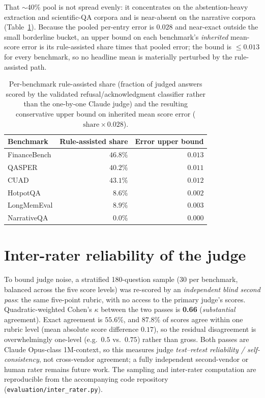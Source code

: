 That $\sim$40\% pool is not spread evenly: it concentrates on the
abstention-heavy extraction and scientific-QA corpora and is near-absent on the
narrative corpora (Table~\ref{tab:refusalshare}). Because the pooled per-entry
error is $0.028$ and near-exact outside the small borderline bucket, an upper
bound on each benchmark's \emph{inherited} mean-score error is its rule-assisted
share times that pooled error; the bound is $\le 0.013$ for every benchmark, so
no headline mean is materially perturbed by the rule-assisted path.

\begin{table}[h]
  \centering
  \caption{Per-benchmark rule-assisted share (fraction of judged answers scored
  by the validated refusal/acknowledgment classifier rather than the one-by-one
  Claude judge) and the resulting conservative upper bound on inherited mean
  score error ($\text{share}\times0.028$).}
  \label{tab:refusalshare}
  \begin{tabular}{lrr}
    \toprule
    Benchmark & Rule-assisted share & Error upper bound \\
    \midrule
    FinanceBench & $46.8\%$ & $0.013$ \\
    QASPER       & $40.2\%$ & $0.011$ \\
    CUAD         & $43.1\%$ & $0.012$ \\
    HotpotQA     & $8.6\%$  & $0.002$ \\
    LongMemEval  & $8.9\%$  & $0.003$ \\
    NarrativeQA  & $0.0\%$  & $0.000$ \\
    \bottomrule
  \end{tabular}
\end{table}

\section*{Inter-rater reliability of the judge}
To bound judge noise, a stratified 180-question sample (30 per benchmark,
balanced across the five score levels) was re-scored by an \emph{independent
blind second pass}: the same five-point rubric, with no access to the primary
judge's scores. Quadratic-weighted Cohen's $\kappa$ between the two passes is
\textbf{0.66} (\emph{substantial} agreement). Exact agreement is $55.6\%$, and
$87.8\%$ of scores agree within one rubric level (mean absolute score difference
$0.17$), so the residual disagreement is overwhelmingly one-level (e.g.\ $0.5$
vs.\ $0.75$) rather than gross. Both passes are Claude Opus-class 1M-context, so
this measures judge \emph{test--retest reliability / self-consistency}, not
cross-vendor agreement; a fully independent second-vendor or human rater remains
future work. The sampling and inter-rater computation are reproducible from the
accompanying code repository (\texttt{evaluation/inter\_rater.py}).
